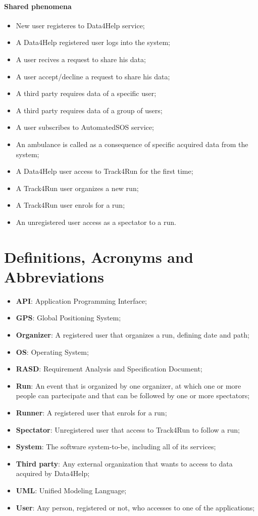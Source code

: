 \paragraph{Shared phenomena}
\begin{itemize}
  \item New user registeres to Data4Help service;
  \item A Data4Help registered user logs into the system;
  \item A user recives a request to share his data;
  \item A user accept/decline a request to share his data;
  \item A third party requires data of a specific user;
  \item A third party requires data of a group of users;
  \item A user subscribes to AutomatedSOS service;
  \item An ambulance is called as a consequence of specific acquired data from the system;
  \item A Data4Help user access to Track4Run for the first time;
  \item A Track4Run user organizes a new run;
  \item A Track4Run user enrols for a run;
  \item An unregistered user access as a spectator to a run.
\end{itemize}
\section{Definitions, Acronyms and Abbreviations}
\begin{itemize}
  \setlength{\itemindent}{-.4in}
  \item[] \textbf{API}: Application Programming Interface;
  \item[] \textbf{GPS}: Global Positioning System;
  \item[] \textbf{Organizer}: A registered user that organizes a run, defining date and path;
  \item[] \textbf{OS}: Operating System;
  \item[] \textbf{RASD}: Requirement Analysis and Specification Document;
  \item[] \textbf{Run}: An event that is organized by one organizer, at which one or more people can partecipate and that can be followed by one or more spectators;
  \item[] \textbf{Runner}: A registered user that enrols for a run;
  \item[] \textbf{Spectator}: Unregistered user that access to Track4Run to follow a run;
  \item[] \textbf{System}: The software system-to-be, including all of its services;
  \item[] \textbf{Third party}: Any external organization that wants to access to data acquired by Data4Help;
  \item[] \textbf{UML}: Unified Modeling Language;
  \item[] \textbf{User}: Any person, registered or not, who accesses to one of the applications;
\end{itemize}

